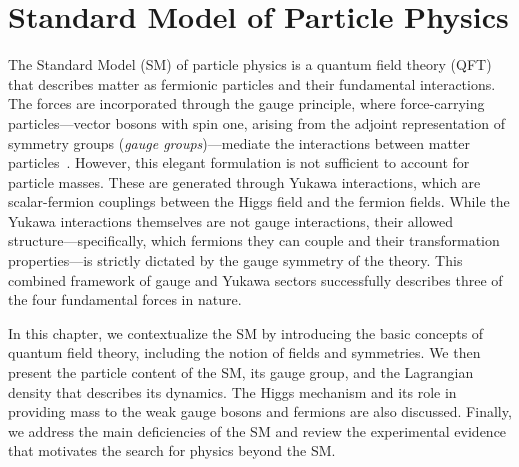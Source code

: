 \chapter{Standard Model of Particle Physics}\label{ch:sm}

The Standard Model (SM) of particle physics is a quantum field theory (QFT) that describes matter as fermionic particles and their fundamental interactions. The forces are incorporated through the gauge principle, where force-carrying particles---vector bosons with spin one, arising from the adjoint representation of symmetry groups (\textit{gauge groups})---mediate the interactions between matter particles~\parencite{greiner2000relativistic,pokorski2000gauge}. However, this elegant formulation is not sufficient to account for particle masses. These are generated through Yukawa interactions, which are scalar-fermion couplings between the Higgs field and the fermion fields. While the Yukawa interactions themselves are not gauge interactions, their allowed structure---specifically, which fermions they can couple and their transformation properties---is strictly dictated by the gauge symmetry of the theory. This combined framework of gauge and Yukawa sectors successfully describes three of the four fundamental forces in nature.

In this chapter, we contextualize the SM by introducing the basic concepts of quantum field theory, including the notion of fields and symmetries. We then present the particle content of the SM, its gauge group, and the Lagrangian density that describes its dynamics. The Higgs mechanism and its role in providing mass to the weak gauge bosons and fermions are also discussed. Finally, we address the main deficiencies of the SM and review the experimental evidence that motivates the search for physics beyond the SM.

